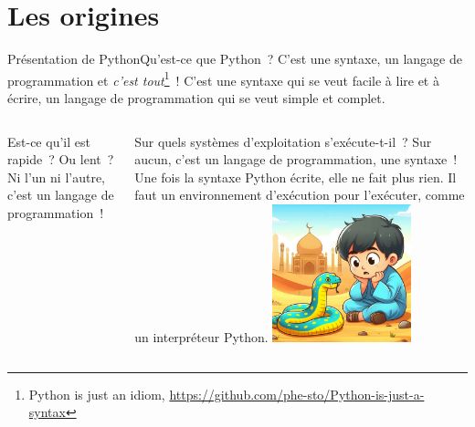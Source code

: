 \documentclass{beamer}
\begin{document}
    \section{Les origines}\label{sec:origines}
    \begin{frame}{Présentation de Python}{Qu'est-ce que Python~?}
        C'est une syntaxe, un langage de programmation et \textit{c'est tout}\footnote{Python is just an idiom, \url{https://github.com/phe-sto/Python-is-just-a-syntax}}~!
        \bigbreak
        C'est une syntaxe qui se veut facile à lire et à écrire, un langage de programmation qui se veut simple et complet.
        \bigbreak
        \begin{columns}
            Est-ce qu'il est rapide~? Ou lent~? Ni l'un ni l'autre, c'est un langage de programmation~!

            Sur quels systèmes d'exploitation s'exécute-t-il~? Sur aucun, c'est un langage de programmation, une syntaxe~!
            \bigbreak
            Une fois la syntaxe Python écrite, elle ne fait plus rien.
            Il faut un environnement d'exécution pour l'exécuter, comme un interpréteur Python.
            \centering
            \includegraphics[width=4cm]{image/useless-python}
        \end{columns}
    \end{frame}
\end{document}
